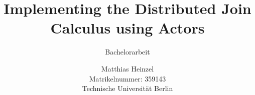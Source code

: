 \title{Implementing the Distributed Join Calculus using Actors}
\author{%
  Matthias Heinzel\\
  Matrikelnummer: 359143\\
  Technische Universität Berlin
  }
\subtitle{Bachelorarbeit}
\publishers{%
  Gutachter:\\
  Prof. Dr. Uwe Nestmann\\
  Prof. Dr. Odej Kao
  }
\maketitle
